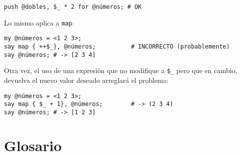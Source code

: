 \begin{enumerate}
\begin{verbatim}
push @dobles, $_ * 2 for @números; # OK
\end{verbatim}

Lo mismo aplica a {\tt map}:

\begin{verbatim}
my @números = <1 2 3>;
say map { ++$_}, @números;          # INCORRECTO (probablemente)
say @números; # -> [2 3 4]
\end{verbatim}
%

Otra vez, el uso de una expresión que no modifique a \verb|$_|
pero que en cambio, devuelva el nuevo valor deseado arreglará
el problema:

\begin{verbatim}
my @números = <1 2 3>;
say map { $_ + 1}, @números;        # -> (2 3 4)
say @números; # -> [1 2 3]
\end{verbatim}
%

\end{enumerate}



\section{Glosario}

